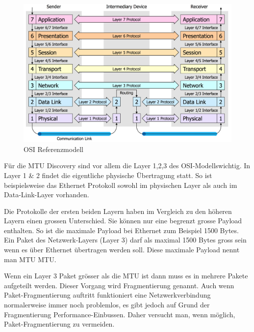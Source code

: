 \begin{figure}[H]
    \begin{center}
        \includegraphics[trim=1 0 0 0,clip,width=\textwidth]{mainpart/analyse/img/OSI_Modell}
    \end{center}
    \caption{\ac{OSI} Referenzmodell}
\end{figure}

Für die \ac{MTU} Discovery sind vor allem die Layer 1,2,3 des \ac{OSI}-Modells\footnotemark[1] wichtig. In Layer 1 \& 2 findet die eigentliche physische Übertragung statt. So ist beispielsweise das Ethernet Protokoll sowohl im physischen Layer als auch im Data-Link-Layer vorhanden.

Die Protokolle der ersten beiden Layern haben im Vergleich zu den höheren Layern einen grossen Unterschied. Sie können nur eine begrenzt grosse Payload enthalten. So ist die maximale Payload bei Ethernet zum Beispiel 1500 Bytes. Ein Paket des Netzwerk-Layers (Layer 3) darf als maximal 1500 Bytes gross sein wenn es über Ethernet übertragen werden soll. Diese maximale Payload nennt man \acl{MTU} \acs{MTU}.


Wenn ein Layer 3 Paket grösser als die \ac{MTU} ist dann muss es in mehrere Pakete aufgeteilt werden. Dieser Vorgang wird Fragmentierung genannt. Auch wenn Paket-Fragmentierung auftritt funktioniert eine Netzwerkverbindung normalerweise immer noch problemlos, es gibt jedoch auf Grund der Fragmentierung Performance-Einbussen. Daher versucht man, wenn möglich, Paket-Fragmentierung zu vermeiden.

